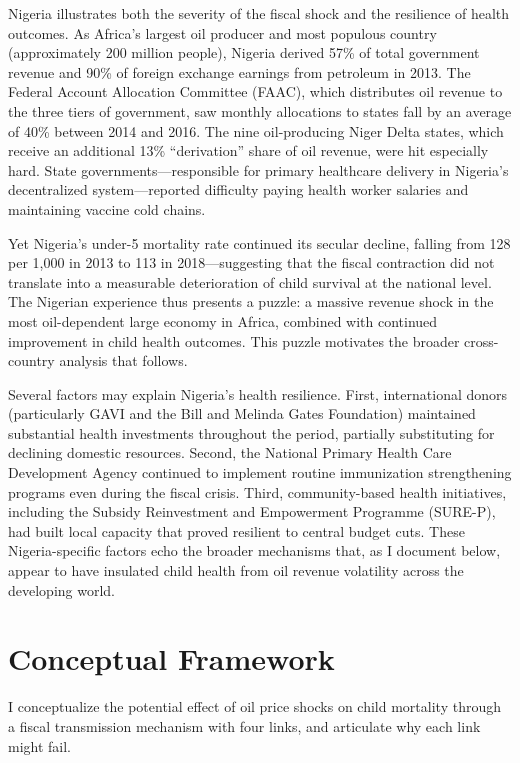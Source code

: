 \documentclass[12pt]{article}
\begin{document}
Nigeria illustrates both the severity of the fiscal shock and the resilience of health outcomes. As Africa's largest oil producer and most populous country (approximately 200 million people), Nigeria derived 57\% of total government revenue and 90\% of foreign exchange earnings from petroleum in 2013. The Federal Account Allocation Committee (FAAC), which distributes oil revenue to the three tiers of government, saw monthly allocations to states fall by an average of 40\% between 2014 and 2016. The nine oil-producing Niger Delta states, which receive an additional 13\% ``derivation'' share of oil revenue, were hit especially hard. State governments---responsible for primary healthcare delivery in Nigeria's decentralized system---reported difficulty paying health worker salaries and maintaining vaccine cold chains.

Yet Nigeria's under-5 mortality rate continued its secular decline, falling from 128 per 1,000 in 2013 to 113 in 2018---suggesting that the fiscal contraction did not translate into a measurable deterioration of child survival at the national level. The Nigerian experience thus presents a puzzle: a massive revenue shock in the most oil-dependent large economy in Africa, combined with continued improvement in child health outcomes. This puzzle motivates the broader cross-country analysis that follows.

Several factors may explain Nigeria's health resilience. First, international donors (particularly GAVI and the Bill and Melinda Gates Foundation) maintained substantial health investments throughout the period, partially substituting for declining domestic resources. Second, the National Primary Health Care Development Agency continued to implement routine immunization strengthening programs even during the fiscal crisis. Third, community-based health initiatives, including the Subsidy Reinvestment and Empowerment Programme (SURE-P), had built local capacity that proved resilient to central budget cuts. These Nigeria-specific factors echo the broader mechanisms that, as I document below, appear to have insulated child health from oil revenue volatility across the developing world.


\section{Conceptual Framework}
\label{sec:framework}

I conceptualize the potential effect of oil price shocks on child mortality through a fiscal transmission mechanism with four links, and articulate why each link might fail.
\end{document}
